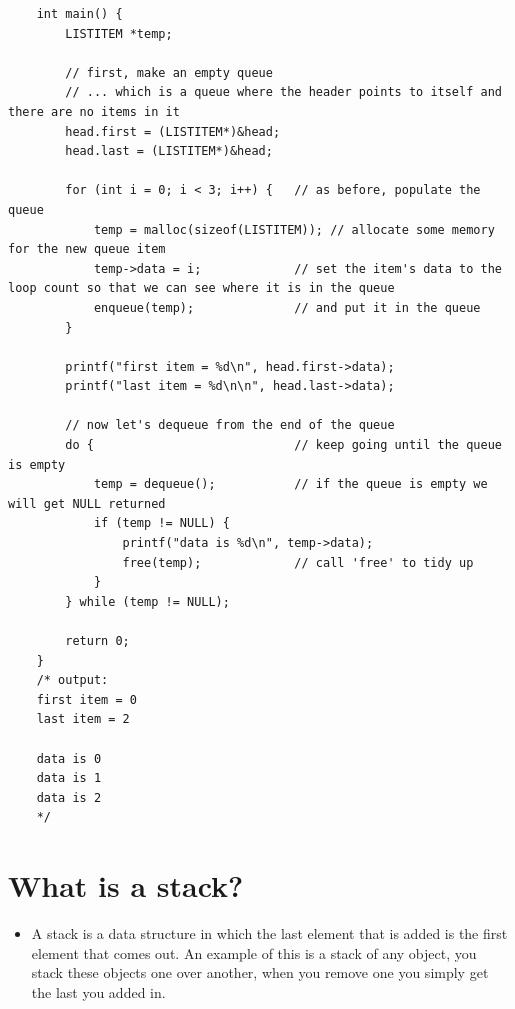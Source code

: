 \begin{verbatim}
    int main() {
        LISTITEM *temp;

        // first, make an empty queue
        // ... which is a queue where the header points to itself and there are no items in it
        head.first = (LISTITEM*)&head;
        head.last = (LISTITEM*)&head;

        for (int i = 0; i < 3; i++) {	// as before, populate the queue
            temp = malloc(sizeof(LISTITEM)); // allocate some memory for the new queue item
            temp->data = i;				// set the item's data to the loop count so that we can see where it is in the queue
            enqueue(temp);				// and put it in the queue
        }

        printf("first item = %d\n", head.first->data);
        printf("last item = %d\n\n", head.last->data);

        // now let's dequeue from the end of the queue
        do {							// keep going until the queue is empty
            temp = dequeue();			// if the queue is empty we will get NULL returned
            if (temp != NULL) {
                printf("data is %d\n", temp->data);
                free(temp);				// call 'free' to tidy up 
            }
        } while (temp != NULL);

        return 0;
    }
    /* output:
    first item = 0
    last item = 2

    data is 0
    data is 1
    data is 2
    */
\end{verbatim}

\section{What is a stack?}
\begin{itemize}
    \item A stack is a data structure in which the last element that is added is the first element that comes out. An example of this is a stack of any object, you stack these objects one over another, when you remove one you simply get the last you added in.
\end{itemize}


